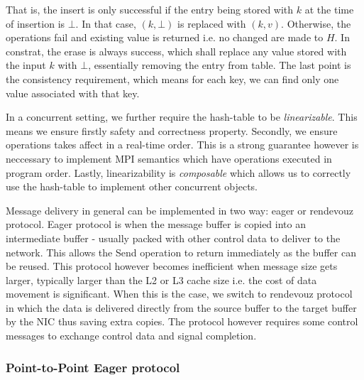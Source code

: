 \documentclass[11pt]{article}
\begin{document}
That is, the insert is only successful if the entry being stored with $k$ at
the time of insertion is $\bot$.  In that case, $(k,\bot)$ is replaced with
$(k, v)$. Otherwise, the operations fail and existing value is returned i.e. no
changed are made to $H$. In constrat, the erase is always success, which shall
replace any value stored with the input $k$ with $\bot$, essentially removing
the entry from table.  The last point is the consistency requirement, which
means for each key, we can find only one value associated with that key.

In a concurrent setting, we further require the hash-table to be
\textit{linearizable}.  This means we ensure firstly safety and correctness
property. Secondly, we ensure operations takes affect in a real-time order.
This is a strong guarantee however is neccessary to implement MPI semantics
which have operations executed in program order. Lastly, linearizability is 
\textit{composable} which allows us to correctly use the hash-table to implement
other concurrent objects.

Message delivery in general can be implemented in two way: eager or rendevouz
protocol. Eager protocol is when the message buffer is copied into an
intermediate buffer - usually packed with other control data to deliver to the
network. This allows the Send operation to return immediately as the buffer
can be reused.  This protocol however becomes inefficient when message size
gets larger, typically larger than the L2 or L3 cache size i.e. the cost of
data movement is significant.  When this is the case, we switch to rendevouz
protocol in which the data is delivered directly from the source buffer to the
target buffer by the NIC thus saving extra copies.  The protocol however requires
some control messages to exchange control data and signal completion.

\subsubsection{Point-to-Point Eager protocol}
\end{document}
